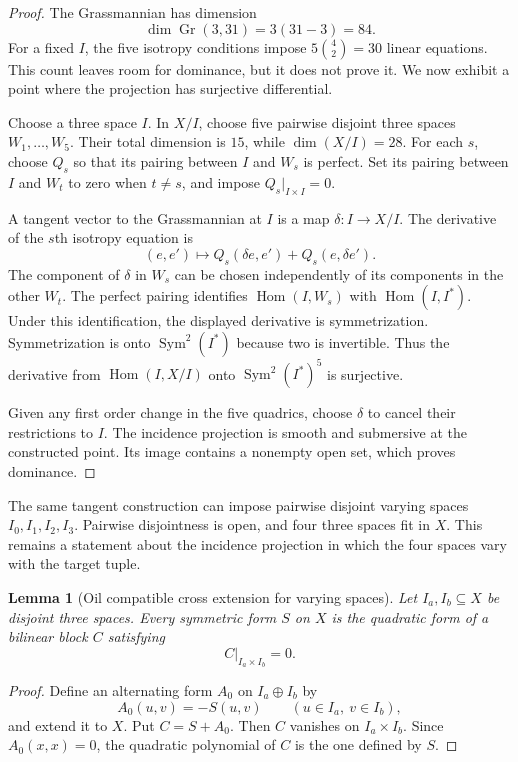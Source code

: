 \documentclass[11pt]{article}
\newcommand{\Sym}{\operatorname{Sym}}
\newcommand{\Gr}{\operatorname{Gr}}
\newcommand{\Hom}{\operatorname{Hom}}
\theoremstyle{plain}
\newtheorem{lemma}[theorem]{Lemma}
\theoremstyle{definition}
\theoremstyle{remark}
\begin{document}
\begin{proof}
The Grassmannian has dimension
\[
  \dim\Gr(3,31)=3(31-3)=84.
\]
For a fixed $I$, the five isotropy conditions impose
$5\binom{4}{2}=30$ linear equations.  This count leaves room for dominance,
but it does not prove it.  We now exhibit a point where the projection has
surjective differential.

Choose a three space $I$.  In $X/I$, choose five pairwise disjoint three
spaces $W_1,\ldots,W_5$.  Their total dimension is $15$, while
$\dim(X/I)=28$.  For each $s$, choose $Q_s$ so that its pairing between $I$
and $W_s$ is perfect.  Set its pairing between $I$ and $W_t$ to zero when
$t\ne s$, and impose $Q_s|_{I\times I}=0$.

A tangent vector to the Grassmannian at $I$ is a map
$\delta:I\to X/I$.  The derivative of the $s$th isotropy equation is
\[
  (e,e')\longmapsto
  Q_s(\delta e,e')+Q_s(e,\delta e').
\]
The component of $\delta$ in $W_s$ can be chosen independently of its
components in the other $W_t$.  The perfect pairing identifies
$\Hom(I,W_s)$ with $\Hom(I,I^*)$.  Under this identification, the displayed
derivative is symmetrization.  Symmetrization is onto $\Sym^2(I^*)$ because
two is invertible.  Thus the derivative from
$\Hom(I,X/I)$ onto $\Sym^2(I^*)^5$ is surjective.

Given any first order change in the five quadrics, choose $\delta$ to cancel
their restrictions to $I$.  The incidence projection is smooth and
submersive at the constructed point.  Its image contains a nonempty open set,
which proves dominance.
\end{proof}

The same tangent construction can impose pairwise disjoint varying spaces
$I_0,I_1,I_2,I_3$.  Pairwise disjointness is open, and four three spaces fit
in $X$.  This remains a statement about the incidence projection in which the
four spaces vary with the target tuple.

\begin{lemma}[Oil compatible cross extension for varying spaces]
\label{lem:l4-oil-cross}
Let $I_a,I_b\subseteq X$ be disjoint three spaces.  Every symmetric form
$S$ on $X$ is the quadratic form of a bilinear block $C$ satisfying
\[
  C|_{I_a\times I_b}=0.
\]
\end{lemma}

\begin{proof}
Define an alternating form $A_0$ on $I_a\oplus I_b$ by
\[
  A_0(u,v)=-S(u,v)
  \qquad (u\in I_a,\ v\in I_b),
\]
and extend it to $X$.  Put $C=S+A_0$.  Then $C$ vanishes on
$I_a\times I_b$.  Since $A_0(x,x)=0$, the quadratic polynomial of $C$ is the
one defined by $S$.
\end{proof}
\end{document}
